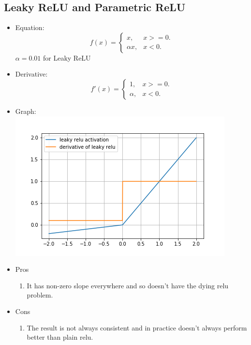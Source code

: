 \documentclass{article}
\begin{document}
\subsection{Leaky ReLU and Parametric ReLU}
\begin{itemize}
    \item Equation: 
    \begin{equation*}
        f(x)=\begin{cases}
        x, & \text{$x>=0$}.\\
        \alpha x, & \text{$x<0$}.
        \end{cases}
    \end{equation*}
    $\alpha=0.01$ for Leaky ReLU
    \item Derivative:
    \begin{equation*}
        f'(x)=\begin{cases}
        1, & \text{$x>=0$}.\\
        \alpha, & \text{$x<0$}.
        \end{cases}
    \end{equation*}
    \item Graph:\\ \includegraphics[center]{leaky_relu.png}
    \item Pros
    \begin{enumerate}
        \item It has non-zero slope everywhere and so doesn't have the dying relu problem.
    \end{enumerate}
    \item Cons
    \begin{enumerate}
        \item The result is not always consistent and in practice doesn't always perform better than plain relu.
    \end{enumerate}
\end{itemize}
\end{document}
